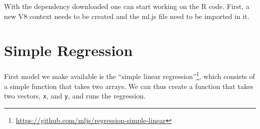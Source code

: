 \documentclass[
]{krantz}
\makeatletter
\newenvironment{Shaded}{\begin{snugshade}}{\end{snugshade}}
\newcommand{\CommentTok}[1]{\textcolor[rgb]{0.37,0.37,0.37}{\textit{#1}}}
\newcommand{\ControlFlowTok}[1]{\textcolor[rgb]{0.27,0.27,0.27}{\textbf{#1}}}
\newcommand{\DataTypeTok}[1]{\textcolor[rgb]{0.27,0.27,0.27}{#1}}
\newcommand{\KeywordTok}[1]{\textcolor[rgb]{0.27,0.27,0.27}{\textbf{#1}}}
\newcommand{\NormalTok}[1]{#1}
\newcommand{\OperatorTok}[1]{\textcolor[rgb]{0.43,0.43,0.43}{\textbf{#1}}}
\newcommand{\OtherTok}[1]{\textcolor[rgb]{0.37,0.37,0.37}{#1}}
\newcommand{\StringTok}[1]{\textcolor[rgb]{0.5,0.5,0.5}{#1}}
\renewcommand{\href}[2]{#2\footnote{\url{#1}}}
\newenvironment{kframe}{%
\medskip{}
\setlength{\fboxsep}{.8em}
 \def\at@end@of@kframe{}%
 \ifinner\ifhmode%
  \def\at@end@of@kframe{\end{minipage}}%
  \begin{minipage}{\columnwidth}%
 \fi\fi%
 \def\FrameCommand##1{\hskip\@totalleftmargin \hskip-\fboxsep
 \colorbox{shadecolor}{##1}\hskip-\fboxsep
     \hskip-\linewidth \hskip-\@totalleftmargin \hskip\columnwidth}%
 \MakeFramed {\advance\hsize-\width
   \@totalleftmargin\z@ \linewidth\hsize
   \@setminipage}}%
 {\par\unskip\endMakeFramed%
 \at@end@of@kframe}
\renewenvironment{Shaded}{\begin{kframe}}{\end{kframe}}
\makeatother
\begin{document}
With the dependency downloaded one can start working on the R code. First, a new V8 context needs to be created and the ml.js file need to be imported in it.

\begin{Shaded}
\end{Shaded}

\hypertarget{v8-ml-regression}{%
\section{Simple Regression}\label{v8-ml-regression}}

First model we make available is the \href{https://github.com/mljs/regression-simple-linear}{``simple linear regression''}, which consists of a simple function that takes two arrays. We can thus create a function that takes two vectors, \texttt{x}, and \texttt{y}, and runs the regression.

\begin{Shaded}
\end{Shaded}
\end{document}
